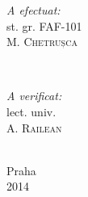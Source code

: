 \documentclass{standalone}
\begin{document}
\begin{titlepage}
\begin{minipage}{0.4\textwidth}
\begin{flushleft}
\emph{A efectuat:}\\
st. gr. FAF-101\\
 \textsc{M. Chetrușca} %
\end{flushleft}
\end{minipage}
~
\begin{minipage}{0.4\textwidth}
\begin{flushright} 
\emph{A verificat:} \\
lect. univ.\\
 \textsc{A. Railean} %
\end{flushright}
\end{minipage}\\[1cm]



{ Praha  }\\[0.2 cm] 
{ 2014 }\\ %


 

\vfill %

\end{titlepage}
\end{document}
